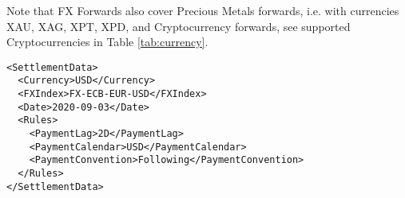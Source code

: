 Note that FX Forwards also cover Precious Metals forwards, i.e. with currencies XAU, XAG, XPT, XPD, and Cryptocurrency forwards,  see supported Cryptocurrencies in Table \ref{tab:currency}.

\begin{listing}[H]
\begin{verbatim}
<SettlementData>
  <Currency>USD</Currency>
  <FXIndex>FX-ECB-EUR-USD</FXIndex>
  <Date>2020-09-03</Date>
  <Rules>
    <PaymentLag>2D</PaymentLag>
    <PaymentCalendar>USD</PaymentCalendar>
    <PaymentConvention>Following</PaymentConvention>
  </Rules>
</SettlementData>
\end{verbatim}
\caption{Example \lstinline!SettlementData! node with \lstinline!Rules! sub-node}
\label{lst:settlement_data_node}
\end{listing}

